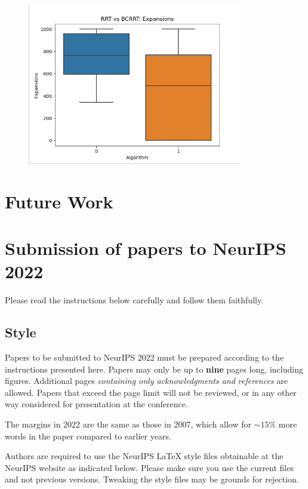 \documentclass{article}
\begin{document}
\begin{figure}[htbp]
	\centerline{\includegraphics{BoxWhiskerExpansions.png}}
\end{figure}


\section{Future Work}





\section{Submission of papers to NeurIPS 2022}


Please read the instructions below carefully and follow them faithfully.


\subsection{Style}


Papers to be submitted to NeurIPS 2022 must be prepared according to the
instructions presented here. Papers may only be up to {\bf nine} pages long,
including figures. Additional pages \emph{containing only acknowledgments and
references} are allowed. Papers that exceed the page limit will not be
reviewed, or in any other way considered for presentation at the conference.


The margins in 2022 are the same as those in 2007, which allow for $\sim$$15\%$
more words in the paper compared to earlier years.


Authors are required to use the NeurIPS \LaTeX{} style files obtainable at the
NeurIPS website as indicated below. Please make sure you use the current files
and not previous versions. Tweaking the style files may be grounds for
rejection.
\end{document}
